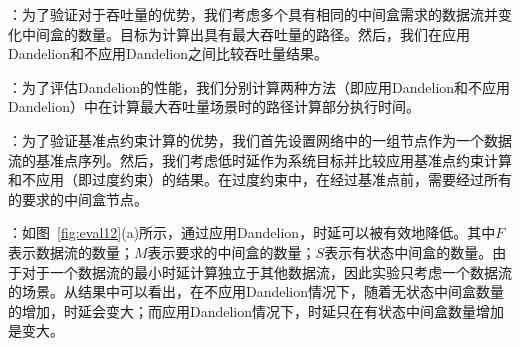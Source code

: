 
：为了验证对于吞吐量的优势，我们考虑多个具有相同的中间盒需求的数据流并变化中间盒的数量。目标为计算出具有最大吞吐量的路径。然后，我们在应用Dandelion和不应用Dandelion之间比较吞吐量结果。


：为了评估Dandelion的性能，我们分别计算两种方法（即应用Dandelion和不应用Dandelion）中在计算最大吞吐量场景时的路径计算部分执行时间。


：为了验证基准点约束计算的优势，我们首先设置网络中的一组节点作为一个数据流的基准点序列。然后，我们考虑低时延作为系统目标并比较应用基准点约束计算和不应用（即过度约束）的结果。在过度约束中，在经过基准点前，需要经过所有的要求的中间盒节点。


：如图~\ref{fig:eval12}(a)所示，通过应用Dandelion，时延可以被有效地降低。其中$F$表示数据流的数量；$M$表示要求的中间盒的数量；$S$表示有状态中间盒的数量。由于对于一个数据流的最小时延计算独立于其他数据流，因此实验只考虑一个数据流的场景。从结果中可以看出，在不应用Dandelion情况下，随着无状态中间盒数量的增加，时延会变大；而应用Dandelion情况下，时延只在有状态中间盒数量增加是变大。

